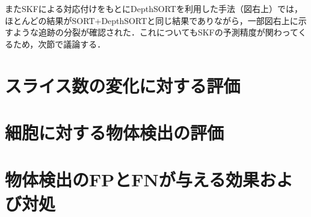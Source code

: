         またSKFによる対応付けをもとにDepthSORTを利用した手法（図右上）では，ほとんどの結果がSORT+DepthSORTと同じ結果でありながら，一部図右上に示すような追跡の分裂が確認された．これについてもSKFの予測精度が関わってくるため，次節で議論する．

\section{スライス数の変化に対する評価}
\label{sec:number_of_slice}

\section{細胞に対する物体検出の評価}
\label{sec:cell_detection}

\section{物体検出のFPとFNが与える効果および対処}
\label{sec:covering_detection}
